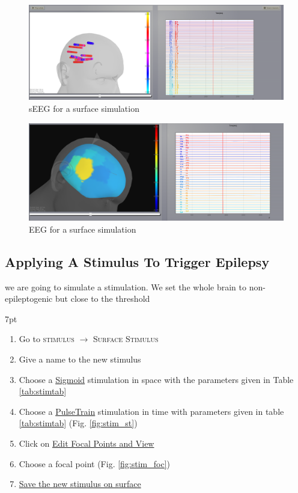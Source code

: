 \documentclass{tufte-handout}
\newenvironment{formal}{%
  \def\FrameCommand{%
    \hspace{1pt}%
    {\color{DarkBlue}\vrule width 2pt}%
    {\color{formalshade}\vrule width 4pt}%
    \colorbox{formalshade}%
  }%
  \MakeFramed{\advance\hsize-\width\FrameRestore}%
  \noindent\hspace{-4.55pt}%
  \begin{adjustwidth}{}{7pt}%
  \vspace{2pt}\vspace{2pt}%
}
{%
  \vspace{2pt}\end{adjustwidth}\endMakeFramed%
}
\begin{document}
\begin{figure}[h]
  \includegraphics[width=\linewidth]{Handout_UI_ModellingAnEpilepticPatient_sEEGSurface}%
  \caption{sEEG for a surface simulation}%
  \label{fig:surf_sEEG}%
\end{figure}

\begin{figure}[h]
  \includegraphics[width=\linewidth]{Handout_UI_ModellingAnEpilepticPatient_EEGSurface}%
  \caption{EEG for a surface simulation}%
  \label{fig:surf_EEG}%
\end{figure}

\subsection{Applying A Stimulus To Trigger Epilepsy}

 we are going to simulate a stimulation.
We set the whole brain to non-epileptogenic but close to the threshold

  \begin{formal}
  \begin{enumerate}
  \item Go to \textsc{stimulus} $\rightarrow$ \textsc{Surface Stimulus}
  \item Give a name to the new stimulus
  \item Choose a \underline{Sigmoid} stimulation in space with the parameters given in Table \ref{tab:stimtab}
  \item Choose a \underline{PulseTrain} stimulation in time with parameters given in table \ref{tab:stimtab} (Fig. \ref{fig:stim_st})
  \item Click on \underline{Edit Focal Points and View}
  \item Choose a focal point (Fig. \ref{fig:stim_foc})
  \item \underline{Save the new stimulus on surface}
  \end{enumerate}
\end{formal}
\end{document}
